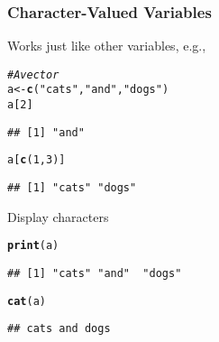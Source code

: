 \documentclass[paper=screen,mathserif]{beamer}\usepackage[]{graphicx}\usepackage[]{color}
\makeatletter
\newcommand{\hlnum}[1]{\textcolor[rgb]{0.686,0.059,0.569}{#1}}%
\newcommand{\hlstr}[1]{\textcolor[rgb]{0.192,0.494,0.8}{#1}}%
\newcommand{\hlcom}[1]{\textcolor[rgb]{0.678,0.584,0.686}{\textit{#1}}}%
\newcommand{\hlstd}[1]{\textcolor[rgb]{0.345,0.345,0.345}{#1}}%
\newcommand{\hlkwb}[1]{\textcolor[rgb]{0.69,0.353,0.396}{#1}}%
\newcommand{\hlkwd}[1]{\textcolor[rgb]{0.737,0.353,0.396}{\textbf{#1}}}%
\newenvironment{kframe}{%
 \def\at@end@of@kframe{}%
 \ifinner\ifhmode%
  \def\at@end@of@kframe{\end{minipage}}%
  \begin{minipage}{\columnwidth}%
 \fi\fi%
 \def\FrameCommand##1{\hskip\@totalleftmargin \hskip-\fboxsep
 \colorbox{shadecolor}{##1}\hskip-\fboxsep
     \hskip-\linewidth \hskip-\@totalleftmargin \hskip\columnwidth}%
 \MakeFramed {\advance\hsize-\width
   \@totalleftmargin\z@ \linewidth\hsize
   \@setminipage}}%
 {\par\unskip\endMakeFramed%
 \at@end@of@kframe}
\newenvironment{knitrout}{}{} %
\newcommand{\ft}[1]{\frametitle{#1}}
\newenvironment{xframe}[1][]
{\begin{frame}[fragile,environment=xframe]
    \frametitle{#1}}
  {\end{frame}}
\makeatother
\begin{document}
\begin{xframe}
  \ft{Character-Valued Variables}
  
  Works just like other variables, e.g., 
\begin{knitrout}\scriptsize
{}\color{fgcolor}\begin{kframe}
\begin{alltt}
\hlcom{# A vector}
\hlstd{a} \hlkwb{<-} \hlkwd{c}\hlstd{(}\hlstr{"cats"}\hlstd{,} \hlstr{"and"}\hlstd{,} \hlstr{"dogs"}\hlstd{)}
\hlstd{a[}\hlnum{2}\hlstd{]}
\end{alltt}
\begin{verbatim}
## [1] "and"
\end{verbatim}
\begin{alltt}
\hlstd{a[}\hlkwd{c}\hlstd{(}\hlnum{1}\hlstd{,} \hlnum{3}\hlstd{)]}
\end{alltt}
\begin{verbatim}
## [1] "cats" "dogs"
\end{verbatim}
\end{kframe}
\end{knitrout}
Display characters
\begin{knitrout}\scriptsize
{}\color{fgcolor}\begin{kframe}
\begin{alltt}
\hlkwd{print}\hlstd{(a)}
\end{alltt}
\begin{verbatim}
## [1] "cats" "and"  "dogs"
\end{verbatim}
\begin{alltt}
\hlkwd{cat}\hlstd{(a)}
\end{alltt}
\begin{verbatim}
## cats and dogs
\end{verbatim}
\end{kframe}
\end{knitrout}
\end{xframe}
\end{document}
